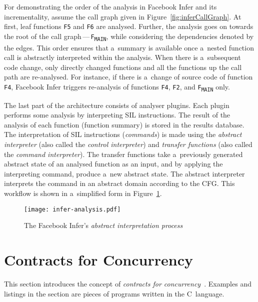 \begin{example}
    \label{ex:AIAnalysis}
    For demonstrating the order of the analysis in Facebook Infer and its incrementality, assume the call graph given in Figure~\ref{fig:inferCallGraph}. At first, leaf functions \texttt{F5} and \texttt{F6} are analysed. Further, the analysis goes on towards the root of the call graph\,---\,\texttt{F\textsubscript{MAIN}}, while considering the dependencies denoted by the edges. This order ensures that a~summary is available once a~nested function call is abstractly interpreted within the analysis. When there is a~subsequent code change, only directly changed functions and all the functions up the call path are re-analysed. For instance, if there is a~change of source code of function \texttt{F4}, Facebook Infer triggers re-analysis of functions \texttt{F4}, \texttt{F2}, and \texttt{F\textsubscript{MAIN}} only.
\end{example}

The last part of the architecture consists of analyser plugins. Each plugin performs some analysis by interpreting SIL instructions. The result of the analysis of each function (function summary) is stored in the results database. The interpretation of SIL instructions (\emph{commands}) is made using the \emph{abstract interpreter} (also called the \emph{control interpreter}) and \emph{transfer functions} (also called the \emph{command interpreter}). The transfer functions take a~previously generated abstract state of an analysed function as an input, and by applying the interpreting command, produce a~new abstract state. The abstract interpreter interprets the command in an abstract domain according to the CFG. This workflow is shown in a~simplified form in Figure~\ref{fig:inferAnalysis}.

\begin{figure}[hbt]
    \centering
    \texttt{[image: infer-analysis.pdf]}
    \caption{The Facebook Infer's \emph{abstract interpretation process}~\cite{harmimBP}}
    \label{fig:inferAnalysis}
\end{figure}


\section{Contracts for Concurrency}
\label{sec:contracts}

This section introduces the concept of \emph{contracts for concurrency}~\cite{contracts2017, contracts2015}. Examples and listings in the section are pieces of programs written in the C~language.

